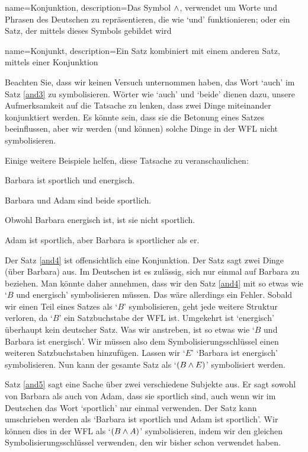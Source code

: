 {
name=Konjunktion,
description={Das Symbol $\wedge$, verwendet um Worte und Phrasen des Deutschen zu repräsentieren, die wie `und' funktionieren; oder ein Satz, der mittels dieses Symbols gebildet wird}
}

{
name=Konjunkt,
description={Ein Satz kombiniert mit einem anderen Satz, mittels einer \gls{Konjunktion}}
}

Beachten Sie, dass wir keinen Versuch unternommen haben, das Wort `auch' im Satz \ref{and3} zu symbolisieren. Wörter wie `auch' und `beide' dienen dazu, unsere Aufmerksamkeit auf die Tatsache zu lenken, dass zwei Dinge miteinander konjunktiert werden. Es könnte sein, dass sie die Betonung eines Satzes beeinflussen, aber wir werden (und können) solche Dinge in der WFL nicht symbolisieren.

Einige weitere Beispiele helfen, diese Tatsache zu veranschaulichen:
	\begin{earg}
		\item[\ex{and4}] Barbara ist sportlich und energisch.
		\item[\ex{and5}] Barbara und Adam sind beide sportlich.
		\item[\ex{and6}] Obwohl Barbara energisch ist, ist sie nicht sportlich.
		\item[\ex{and7}] Adam ist sportlich, aber Barbara is sportlicher als er.
	\end{earg}
Der Satz \ref{and4} ist offensichtlich eine Konjunktion. Der Satz sagt zwei Dinge (über Barbara) aus. Im Deutschen ist es zulässig, sich nur einmal auf Barbara zu beziehen. Man könnte daher annehmen, dass wir den Satz \ref{and4} mit so etwas wie `$B$ und energisch' symbolisieren müssen. Das wäre allerdings ein Fehler. Sobald wir einen Teil eines Satzes als `$B$' symbolisieren, geht jede weitere Struktur verloren, da `$B$' ein Satzbuchstabe der WFL ist. Umgekehrt ist `energisch' überhaupt kein deutscher Satz. Was wir anstreben, ist so etwas wie `$B$ und Barbara ist energisch'. Wir müssen also dem Symbolisierungsschlüssel einen weiteren Satzbuchstaben hinzufügen. Lassen wir `$E$' `Barbara ist energisch' symbolisieren. Nun kann der gesamte Satz als `$(B \wedge E)$' symbolisiert werden.

Satz \ref{and5} sagt eine Sache über zwei verschiedene Subjekte aus. Er sagt sowohl von Barbara als auch von Adam, dass sie sportlich sind, auch wenn wir im Deutschen das Wort `sportlich' nur einmal verwenden. Der Satz kann umschrieben werden als `Barbara ist sportlich und Adam ist sportlich'. Wir können dies in der WFL als `$(B \wedge A)$' symbolisieren, indem wir den gleichen Symbolisierungsschlüssel verwenden, den wir bisher schon verwendet haben.

